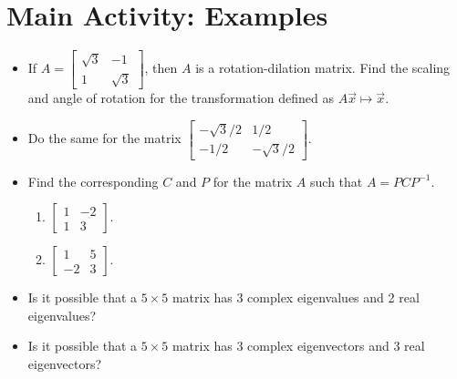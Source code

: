 \documentclass{beamer}
\begin{document}
	\section{Main Activity: Examples}	
	\begin{frame}
		\begin{itemize}
			\item<1-> If \(A = \begin{bmatrix}\sqrt{3} & -1 \\ 1 & \sqrt{3}\end{bmatrix}\), then \(A\) is a rotation-dilation matrix. Find the scaling and angle of
				rotation for the transformation defined as \(A\vec{x} \mapsto \vec{x}\).
			\item<2-> Do the same for the matrix \(\begin{bmatrix}-\sqrt{3}/2 & 1/2\\ -1/2 & -\sqrt{3}/2\end{bmatrix}\).
			\item<3-> Find the corresponding \(C\) and \(P\) for the matrix \(A\) such that \(A = PCP^{-1}\).
				\begin{enumerate}
					\item<4-> \(\begin{bmatrix}1 & -2 \\ 1 & 3\end{bmatrix}\).
					\item<5-> \(\begin{bmatrix}1 & 5 \\ -2 & 3\end{bmatrix}\).
				\end{enumerate}
			\item<6-> Is it possible that a \(5 \times 5\) matrix has 3 complex eigenvalues and 2 real eigenvalues?
			\item<7-> Is it possible that a \(5 \times 5\) matrix has 3 complex eigenvectors and 3 real eigenvectors? 
		\end{itemize}
	\end{frame}
\end{document}
